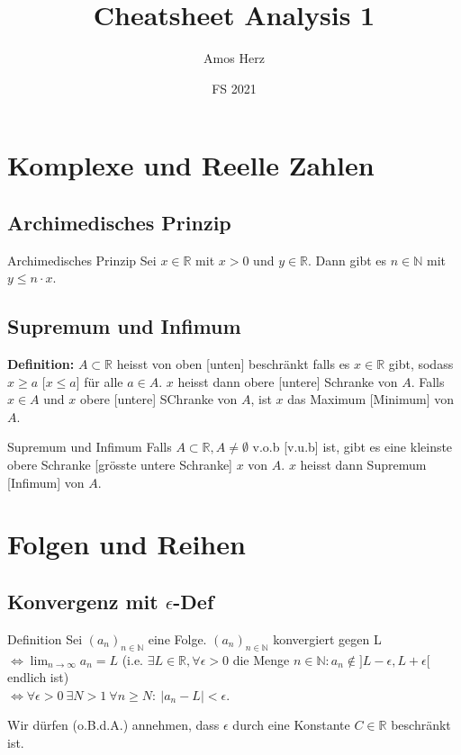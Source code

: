 \documentclass[a4paper,8pt]{extarticle}
\title{\vspace{-1cm}Cheatsheet Analysis 1\vspace{-0.75cm}}
\author{Amos Herz\vspace{-0.5cm}}
\date{FS 2021}
\newenvironment{definition}{
   \noindent \textbf{Definition:  }}{}
\def\R{\mathbb{R}}
\def\N{\mathbb{N}}
\begin{document}
\section{Komplexe und Reelle Zahlen}
\subsection{Archimedisches Prinzip}
\begin{mainbox}{Archimedisches Prinzip}
  Sei $x \in \R$ mit $x > 0$ und $y \in \R$. Dann gibt es $n \in \N$ mit $y \leq n \cdot x$.
\end{mainbox}

\subsection{Supremum und Infimum}
\begin{definition}
  $A \subset \R$ heisst von oben [unten] beschränkt falls es $x \in \R$ gibt, sodass $x \geq a$ [$x \leq a$] für alle $a \in A$. $x$ heisst dann obere [untere] Schranke von $A$. Falls $x\in A$ und $x$ obere [untere] SChranke von $A$, ist $x$ das Maximum [Minimum] von $A$.
\end{definition}
\begin{mainbox}{Supremum und Infimum}
  Falls $A \subset \R, A \neq \emptyset$ v.o.b [v.u.b] ist, gibt es eine kleinste obere Schranke [grösste untere Schranke] $x$ von $A$. $x$ heisst dann Supremum [Infimum] von $A$.
\end{mainbox}

\section{Folgen und Reihen}
\subsection{Konvergenz mit $\epsilon$-Def}
\begin{mainbox}{Definition}
  Sei $(a_n)_{n\in \mathbb{N}}$ eine Folge. $(a_n)_{n\in \mathbb{N}}$ konvergiert gegen L \\ $\iff \lim_{n \to \infty} a_n = L $ (i.e. $\exists L \in \R, \forall \epsilon > 0$ die Menge ${n \in \N: a_n \notin ]L - \epsilon, L + \epsilon[}$ endlich ist)\\ $\iff \forall \epsilon > 0 \ \exists N > 1 \ \forall n \ge N : \ | a_n - L | < \epsilon$.
\end{mainbox}
Wir dürfen (o.B.d.A.) annehmen, dass $\epsilon$ durch eine Konstante $C \in \R$ beschränkt ist.
\end{document}
